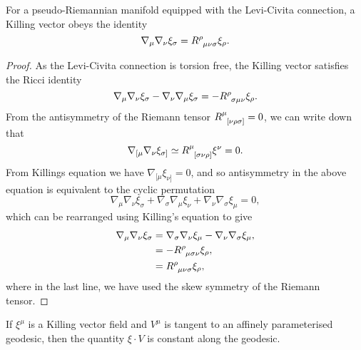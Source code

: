 \begin{lemma}
For a pseudo-Riemannian manifold equipped with the Levi-Civita connection, a Killing vector obeys the identity
\begin{equation}
\label{eq:riekill}
  \nabla_\mu \nabla_\nu \xi_\sigma = \tensor{R}{^\rho_{\mu \nu \sigma}} \xi_\rho.
\end{equation}
\end{lemma}
\begin{proof}
	As the Levi-Civita connection is torsion free, the Killing vector satisfies the Ricci identity 
	\begin{equation*}
		\nabla_\mu \nabla_\nu \xi_\sigma - \nabla_\nu \nabla_\mu \xi_\sigma = - \tensor{R}{^\rho_{\sigma \mu \nu}} \xi_\rho.
	\end{equation*}
	From the antisymmetry of the Riemann tensor $\tensor{R}{^\mu_{[\nu \rho \sigma]}} = 0$, we can write down that
	\begin{equation*}
		\nabla_{[\mu} \nabla_\nu \xi_{\sigma]} \simeq \tensor{R}{^\mu_{[\sigma \nu \rho]}} \xi^\nu = 0.
	\end{equation*}
	From Killings equation  we have $\nabla_{[\mu} \xi_{\nu]} = 0$, and so antisymmetry in the above equation is equivalent to the cyclic permutation
	\begin{equation*}
		\nabla_\mu \nabla_\nu \xi_\sigma + \nabla_\sigma \nabla_\mu \xi_\nu + \nabla_\nu \nabla_\sigma \xi_\mu = 0,
	\end{equation*}
	which can be rearranged using Killing's equation to give
	\begin{equation*}
	\begin{aligned}
		\nabla_\mu \nabla_\nu \xi_\sigma &= \nabla_\sigma \nabla_\nu \xi_\mu - \nabla_\nu \nabla_\sigma \xi_\mu ,  \\
		&= -\tensor{R}{^\rho_{\mu \sigma \nu}} \xi_\rho, \\
		&= \tensor{R}{^\rho_{\mu \nu \sigma}} \xi_\rho,
	\end{aligned}
	\end{equation*}
	where in the last line, we have used the skew symmetry of the Riemann tensor. 
\end{proof}

\begin{lemma}
	If $\xi^\mu$ is a Killing vector field and $V^\mu$ is tangent to an affinely parameterised geodesic, then the quantity $\xi \cdot V$ is constant along the geodesic.
\end{lemma}

